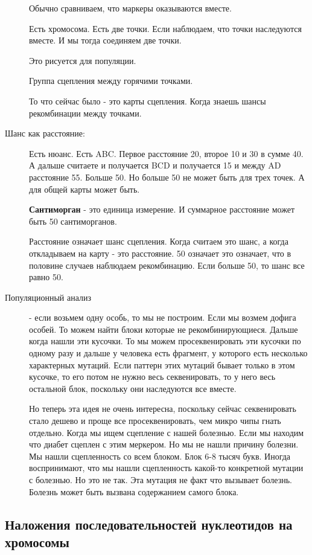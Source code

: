 \begin{description}
Обычно сравниваем, что маркеры оказываются вместе. 

Есть хромосома. Есть две точки. Если наблюдаем, что 
точки наследуются вместе. И мы тогда соединяем две точки. 

Это рисуется для популяции. 

Группа сцепления между горячими точками. 

То что сейчас было - это 
карты сцепления. Когда знаешь шансы рекомбинации между точками. 

\item[Шанс как расстояние:]

Есть нюанс. Есть ABC. Первое расстояние 20, второе 10 и 30 в сумме 40. А дальше считаете и 
получается BCD и получается 15 и между AD расстояние 55. Больше 50. Но больше 50 не может 
быть для трех точек. А для общей карты может быть. 

\textbf{Сантиморган} - это единица измерение. И суммарное расстояние может быть 50 сантиморганов. 

Расстояние означает шанс сцепления. Когда считаем это шанс, а когда откладываем на карту - это 
расстояние. 50 означает это означает, что в половине случаев наблюдаем рекомбинацию. Если больше 50, то 
шанс все равно 50. 

\item[Популяционный анализ] - если возьмем одну особь, то мы не построим. Если мы возмем дофига особей. 
То можем найти блоки которые не рекомбинирующиеся. Дальше когда нашли эти кусочки. То 
мы можем просеквенировать эти кусочки по одному разу и дальше у человека есть 
фрагмент, у которого есть несколько характерных мутаций. Если паттерн этих 
мутаций бывает только в этом кусочке, то его потом не нужно весь секвенировать, 
то у него весь остальной блок, поскольку они наследуются все вместе. 

Но теперь эта идея не очень интересна, поскольку сейчас секвенировать стало дешево и 
проще все просеквенировать, чем микро чипы гнать отдельно. Когда мы ищем сцепление с нашей болезнью. 
Если мы находим что диабет сцеплен с этим меркером. Но мы  не нашли причину болезни. 
Мы нашли сцепленность со всем блоком. Блок 6-8 тысяч букв. Иногда воспринимают, что 
мы нашли сцепленность какой-то конкретной мутации с болезнью. Но это не так. 
Эта мутация не факт что вызывает болезнь. Болезнь может быть вызвана содержанием самого блока.

\end{description}

\subsection{Наложения последовательностей нуклеотидов на хромосомы}

